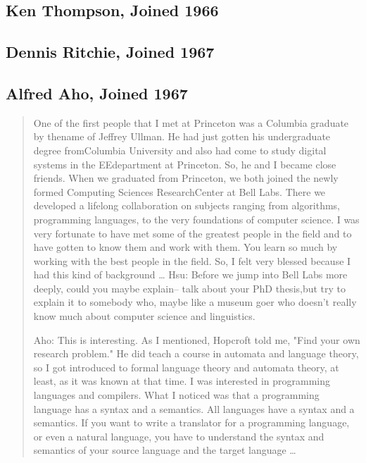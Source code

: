 \subsection{Ken Thompson, Joined 1966}



\subsection{Dennis Ritchie, Joined 1967}



\subsection{Alfred Aho, Joined 1967}

\begin{quotation}
    One of the first people that I met at Princeton was a Columbia graduate by thename of Jeffrey 
Ullman. He had just gotten his undergraduate degree fromColumbia University and also had come to 
study digital systems in the EEdepartment at Princeton. So, he and I became close friends. When we 
graduated from Princeton, we both joined the newly formed Computing Sciences ResearchCenter at Bell 
Labs. There we developed a lifelong collaboration on subjects ranging from algorithms, programming 
languages, to the very foundations of computer science. I was very fortunate to have met some of the 
greatest people in the field and to have gotten to know them and work with them. You learn so much by 
working with the best people in the field. So, I felt very blessed because I had this kind of 
background
\dots
Hsu: Before we jump into Bell Labs more deeply, could you maybe explain-- talk about your PhD 
thesis,but try to explain it to somebody who, maybe like a museum goer who doesn't really know much 
about computer science and linguistics.

Aho: This is interesting. As I mentioned, Hopcroft told me, "Find your own research problem." He 
did teach a course in automata and language theory, so I got introduced to formal language theory 
and automata theory, at least, as it was known at that time. I was interested in programming 
languages and compilers. What I noticed was that a programming language has a syntax and a 
semantics. All languages have a syntax and a semantics. If you want to write a translator for a 
programming language, or even a natural language, you have to understand the syntax and semantics of 
your source language and the target language
\dots


\end{quotation}
